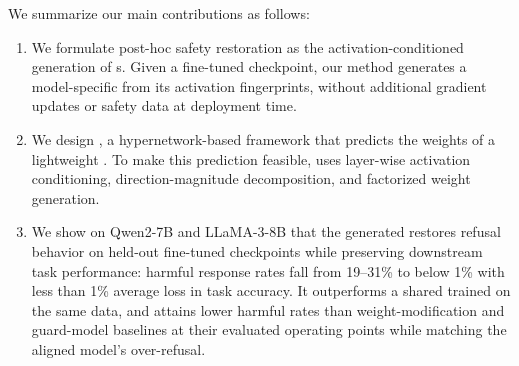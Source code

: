  We summarize our main contributions as follows:
\begin{enumerate}[leftmargin=*,topsep=2pt,itemsep=2pt]
    \item We formulate post-hoc safety restoration as the activation-conditioned generation of \ssn{}s. Given a fine-tuned checkpoint, our method generates a model-specific \ssn{} from its activation fingerprints, without additional gradient updates or safety data at deployment time.

    \item We design \method{}, a hypernetwork-based framework that predicts the weights of a lightweight \ssn{}. To make this prediction feasible, \method{} uses layer-wise activation conditioning, direction-magnitude decomposition, and factorized weight generation.

    \item We show on Qwen2-7B and LLaMA-3-8B that the generated \ssn{} restores refusal behavior on held-out fine-tuned checkpoints while preserving downstream task performance: harmful response rates fall from 19--31\% to below 1\% with less than 1\% average loss in task accuracy. It outperforms a shared \ssn{} trained on the same data, and attains lower harmful rates than weight-modification and guard-model baselines at their evaluated operating points while matching the aligned model's over-refusal.
\end{enumerate}